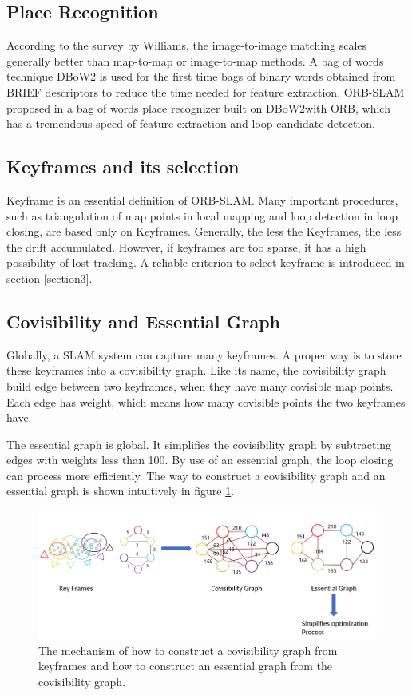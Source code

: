 \documentclass[letterpaper, 10 pt, conference]{ieeeconf}  %
\begin{document}
\subsection{Place Recognition}
According to the survey by Williams, the image-to-image matching scales generally better than map-to-map or image-to-map methods. A bag of words technique DBoW2 is used for the first time bags of binary words obtained from BRIEF descriptors to reduce the time needed for feature extraction. ORB-SLAM proposed in a bag of words place recognizer built on DBoW2with ORB, which has a tremendous speed of feature extraction and loop candidate detection.

\subsection{Keyframes and its selection}
Keyframe is an essential definition of ORB-SLAM. Many important procedures, such as triangulation of map points in local mapping and loop detection in loop closing, are based only on Keyframes. Generally, the less the Keyframes, the less the drift accumulated. However, if keyframes are too sparse, it has a high possibility of lost tracking. A reliable criterion to select keyframe is introduced in section \ref{section3}.

\subsection{Covisibility and Essential Graph}
Globally, a SLAM system can capture many keyframes. A proper way is to store these keyframes into a covisibility graph. Like its name, the covisibility graph build edge between two keyframes, when they have many covisible map points. Each edge has weight, which means how many covisible points the two keyframes have.

The essential graph is global. It simplifies the covisibility graph by subtracting edges with weights less than 100. By use of an essential graph, the loop closing can process more efficiently. The way to construct a covisibility graph and an essential graph is shown intuitively in figure \ref{covisibility_essential_graph}.
%
\begin{figure}[!htbp]%
\centering
\includegraphics[scale=0.148]{./images/covisibility_essential_graph}
\caption{The mechanism of how to construct a covisibility graph from keyframes and how to construct an essential graph from the covisibility graph.}
\label{covisibility_essential_graph}
\end{figure}
%
\end{document}
